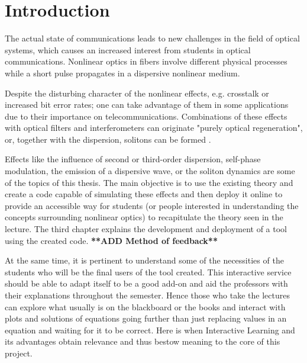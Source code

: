 \chapter{Introduction}

The actual state of communications leads to new challenges in the field of optical systems, which causes an increased interest from students in optical communications. Nonlinear optics in fibers involve different physical processes while a short pulse propagates in a dispersive nonlinear medium. 

Despite the disturbing character of the nonlinear effects, e.g. crosstalk or increased bit error rates; one can take advantage of them in some applications due to their importance on telecommunications. Combinations of these effects with optical filters and interferometers can originate "purely optical regeneration",  or, together with the dispersion, solitons can be formed \cite{rein}.


Effects like the influence of second or third-order dispersion, self-phase modulation, the emission of a dispersive wave, or the soliton dynamics are some of the topics of this thesis. The main objective is to use the existing theory and create a code capable of simulating these effects and then deploy it online to provide an accessible way for students (or people interested in understanding the concepts surrounding nonlinear optics) to recapitulate the theory seen in the lecture. The third chapter explains the development and deployment of a tool using the created code. \textbf{**ADD Method of feedback**} 

At the same time, it is pertinent to understand some of the necessities of the students who will be the final users of the tool created. This interactive service should be able to adapt itself to be a good add-on and aid the professors with their explanations throughout the semester. Hence those who take the lectures can explore what usually is on the blackboard or the books and interact with plots and solutions of equations going further than just replacing values in an equation and waiting for it to be correct. Here is when Interactive Learning and its advantages obtain relevance and thus bestow meaning to the core of this project.



